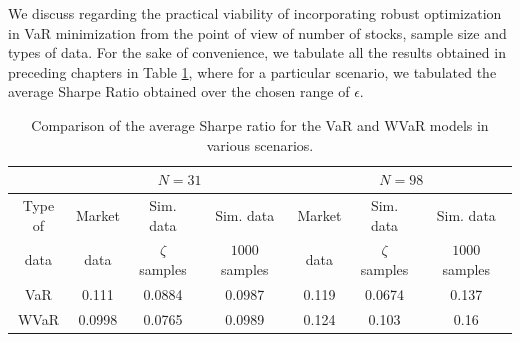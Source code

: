 \documentclass[12pt]{article}
\numberwithin{equation}{section}
\begin{document}
 We discuss regarding the practical viability of incorporating robust optimization in VaR minimization from the point of view of number of stocks, sample size and types of data. For the sake of convenience, we tabulate all the results obtained in preceding chapters in Table \ref{tab:var_conc}, where for a particular scenario, we tabulated the average Sharpe Ratio obtained over the chosen range of $\epsilon$.
\begin{table}[!h]
  \centering
  \small
    \captionsetup{justification=centering}
  \begin{tabular}{|c|c|c|c|c|c|c|}
    \hline
   \multirow{2}{*}{} $N$ &
      \multicolumn{3}{c|}{$N=31$} &
      \multicolumn{3}{c|}{$N=98$}  \\
    \hline
    Type of & Market & Sim. data & Sim. data & Market & Sim. data & Sim. data \\
    data & data & $\zeta$ samples & $1000$ samples & data & $\zeta$ samples & $1000$ samples \\
    \hline
    VaR & 0.111 & 0.0884 & 0.0987 & 0.119 & 0.0674 & 0.137 \\
    \hline
    WVaR & 0.0998 & 0.0765 & 0.0989 & 0.124 & 0.103 & 0.16 \\
    \hline
    
  \end{tabular}
  \caption{Comparison of the average Sharpe ratio for the VaR and WVaR models in various scenarios.}
  \label{tab:var_conc}
\end{table}
    
\end{document}
